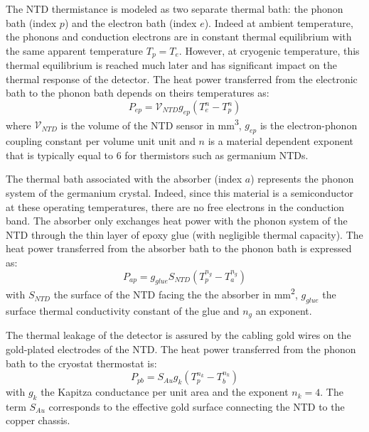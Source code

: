The NTD thermistance is modeled as two separate thermal bath: the phonon bath (index $p$) and the electron bath (index $e$). Indeed at ambient temperature, the phonons and conduction electrons are in constant thermal equilibrium with the same apparent temperature $T_p = T_e$. However, at cryogenic temperature, this thermal equilibrium is reached much later and has significant impact on the thermal response of the detector. The heat power transferred from the electronic bath to the phonon bath depends on theirs temperatures as:
\begin{equation}
\label{eq:ep-heat-power}
P_{ep}= \mathcal{V}_{NTD} g_{ep} (T_e^n - T_p^n)
\end{equation}
where $\mathcal{V}_{NTD}$ is the volume of the NTD sensor in \si{\mm^3}, $g_{ep}$ is the electron-phonon coupling constant per volume unit unit and $n$ is a material dependent exponent that is typically equal to 6 for thermistors such as germanium NTDs.


The thermal bath associated with the absorber (index $a$) represents the phonon system of the germanium crystal. Indeed, since this material is a semiconductor at these operating temperatures, there are no free electrons in the conduction band. The absorber only exchanges heat power with the phonon system of the NTD through the thin layer of epoxy glue (with negligible thermal capacity). The heat power transferred from the absorber bath to the phonon bath is expressed as:
\begin{equation}
\label{eq:ap-heat-power}
P_{ap}=g_{glue} S_{NTD} \left( T_p^{n_g} - T_a^{n_g} \right)
\end{equation}
with $S_{NTD}$ the surface of the NTD facing the the absorber in \si{\mm^2}, $g_{glue}$ the surface thermal conductivity constant of the glue and $n_g$ an exponent. 

The thermal leakage of the detector is assured by the cabling gold wires on the gold-plated electrodes of the NTD. The heat power transferred from the phonon bath to the cryostat thermostat is:
\begin{equation}
\label{eq:pb-heat-transfer}
P_{pb}= S_{Au} g_k (T_p^{n_k} - T_b^{n_k})
\end{equation}
with $g_k$ the Kapitza conductance per unit area and the exponent $n_k=4$. The term $S_{Au}$ corresponds to the effective gold surface connecting the NTD to the copper chassis.

